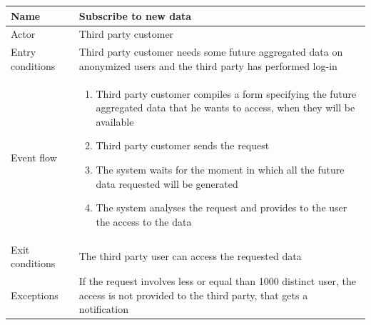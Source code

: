 \begin{table}[H]
\begin{tabularx}{\textwidth}{|l|X|}
\hline
 Name & Subscribe to new data \\ \hline
 Actor & Third party customer  \\ \hline
 Entry conditions & Third party customer needs some future aggregated data on anonymized users and the third party has performed log-in \\ \hline
 Event flow & 
 \begin{enumerate}
 	\item Third party customer compiles a form specifying the future aggregated data that he wants to access, when they will be available
 	\item Third party customer sends the request
 	\item The system waits for the moment in which all the future data requested will be generated 
 	\item The system analyses the request and provides to the user the access to the data 
 \end{enumerate}   \\ \hline
 Exit conditions & The third party user can access the requested data \\ \hline
 Exceptions & If the request involves less or equal than 1000 distinct user, the access is not provided to the third party, that gets a notification \\ \hline
\end{tabularx}
\end{table}


